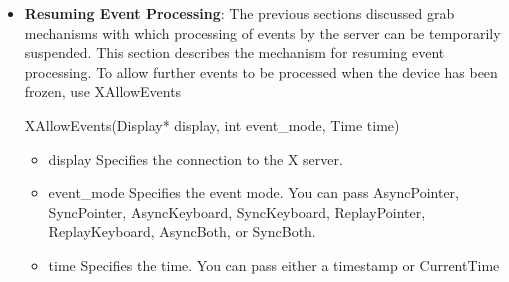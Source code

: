 \documentclass{report}
\begin{document}
\begin{itemize}
            To ungrab a key, use XUngrabKey.
            \bigbreak \noindent 
            \begin{cppcode}
                XUngrabKey (Display display, int keycode, unsigned int modifiers, Window grab_window)
            \end{cppcode}
            \begin{itemize}
                \item display Specifies the connection to the X server.
                \item keycode Specifies the KeyCode or AnyKey.
                \item modifiers Specifies the set of keymasks or AnyModifier. The mask is the bitwise inclusive
                \item OR of the valid keymask bits.
                \item grab\_window Specifies the grab window.
            \end{itemize}
            The XUngrabKey function releases the key combination on the specified window if it was grabbed by this client. It has no effect on an active grab. A modifiers of AnyModifier is equivalent to issuing the request for all possible modifier combinations (including the combination of no modifiers). A keycode argument of AnyKey is equivalent to issuing the request for all possible key codes.
            \bigbreak \noindent 
            XUngrabKey can generate BadValue and BadWindow errors.
        \item \textbf{Resuming Event Processing}: The previous sections discussed grab mechanisms with which processing of events by the server can be temporarily suspended. This section describes the mechanism for resuming event processing.
            \bigbreak \noindent 
            To allow further events to be processed when the device has been frozen, use XAllowEvents
            \bigbreak \noindent 
            \begin{cppcode}
            XAllowEvents(Display* display, int event_mode, Time time)
            \end{cppcode}
            \begin{itemize}
                \item display Specifies the connection to the X server.
                \item event\_mode Specifies the event mode. You can pass AsyncPointer, SyncPointer, AsyncKeyboard, SyncKeyboard, ReplayPointer, ReplayKeyboard, AsyncBoth, or SyncBoth.
                \item time Specifies the time. You can pass either a timestamp or CurrentTime

\end{itemize}
\end{itemize}
\end{document}

